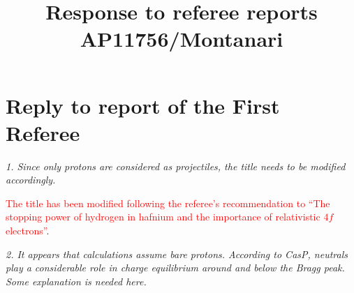 \documentclass[a4paper,10pt]{article}
\title{Response to referee reports \\ AP11756/Montanari }
\def\reviewer#1{\vspace{0.35cm}\textsl{#1}}
\def\reply#1{\vspace{0.1cm}\textcolor{red}{#1}}
\begin{document}
\maketitle

\section{Reply to report of the First Referee}
\reviewer{1. Since only protons are considered as projectiles, the title 
needs to be modified accordingly.}

\reply{The title has been modified following the referee's
recommendation to ``The stopping power of hydrogen in hafnium and the
importance of relativistic $4f$ electrons''}.

\reviewer{2. It appears that calculations assume bare protons. According 
to CasP, neutrals play a considerable role in charge equilibrium around 
and below the Bragg peak. Some explanation is needed here.}
\end{document}
